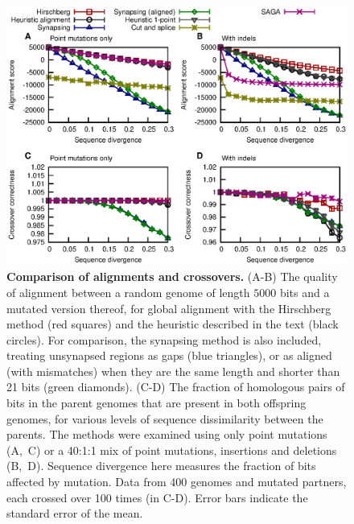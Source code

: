 \documentclass[10pt]{article}
\begin{document}
\begin{figure}[p]
  \centering
  \includegraphics[width=\textwidth]{figures/fig_alignscore.eps}
  \caption{\textbf{Comparison of alignments and crossovers.}
    (A-B) The quality of alignment between a random genome of length $5000$ bits
    and a mutated version thereof, for global alignment with the Hirschberg
    method (red squares) and the heuristic described in the text
    (black circles). For comparison, the synapsing method is also included,
    treating unsynapsed regions as gaps (blue triangles), or as aligned (with
    mismatches) when they are the same length and shorter than 21 bits (green diamonds).
    (C-D) The fraction of homologous pairs of bits in the parent genomes
    that are present in both offspring genomes, for various levels of sequence
    dissimilarity between the parents.
    The methods were examined using only point mutations (A,~C) or a 40:1:1
    mix of point mutations, insertions and deletions (B,~D). Sequence
    divergence here measures the fraction of bits affected by mutation. Data
    from 400 genomes and mutated partners, each crossed over 100 times (in C-D).
    Error bars indicate the standard error of the mean.
  }
  \label{fig:align}
\end{figure}
\end{document}
